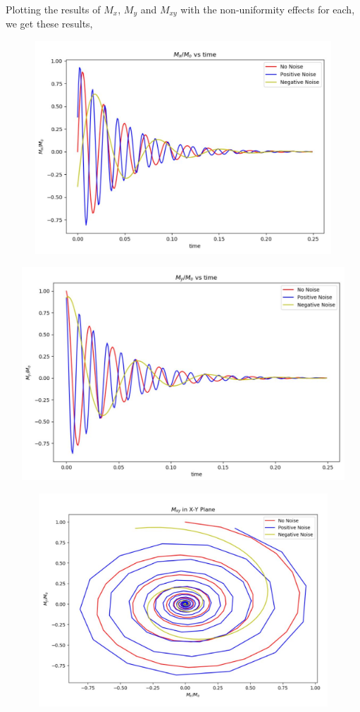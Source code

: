 \documentclass[18pt]{extarticle}
\begin{document}
\pagebreak
Plotting the results of $M_x$, $M_y$ and $M_{xy}$ with the non-uniformity effects for each, we get these results,
\begin{center}
	\includegraphics[width=15cm, height=8cm]{mx}
\end{center}
\begin{center}
	\includegraphics[width=15cm, height=8cm]{my}
\end{center}
\begin{center}
	\includegraphics[width=15cm, height=8cm]{mxy}
\end{center}
\end{document}
